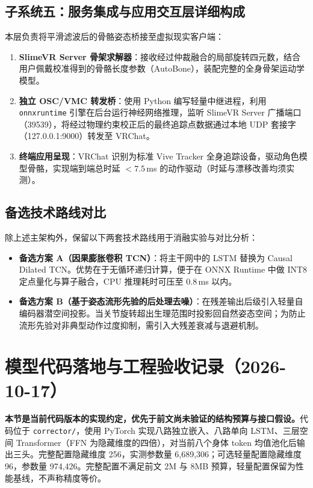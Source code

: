 \documentclass[UTF8,11pt,a4paper]{ctexart}
\begin{document}
\subsection{子系统五：服务集成与应用交互层详细构成}
本层负责将平滑滤波后的骨骼姿态桥接至虚拟现实客户端：
\begin{enumerate}
    \item \textbf{SlimeVR Server 骨架求解器}：接收经过仲裁融合的局部旋转四元数，结合用户佩戴校准得到的骨骼长度参数（AutoBone），装配完整的全身骨架运动学模型。
    \item \textbf{独立 OSC/VMC 转发桥}：使用 Python 编写轻量中继进程，利用 \texttt{onnxruntime} 引擎在后台运行神经网络推理，监听 SlimeVR Server 广播端口（39539），将经过物理约束校正后的最终追踪点数据通过本地 UDP 套接字（127.0.0.1:9000）转发至 VRChat。
    \item \textbf{终端应用呈现}：VRChat 识别为标准 Vive Tracker 全身追踪设备，驱动角色模型骨骼，实现端到端总时延 $< 7.5$\,ms 的动作驱动（时延与漂移改善均须实测）。
\end{enumerate}

\subsection{备选技术路线对比}
除上述主架构外，保留以下两套技术路线用于消融实验与对比分析：
\begin{itemize}
    \item \textbf{备选方案 A（因果膨胀卷积 TCN）}：将主干网中的 LSTM 替换为 Causal Dilated TCN。优势在于无循环递归计算，便于在 ONNX Runtime 中做 INT8 定点量化与算子融合，CPU 推理耗时可压至 $0.8$\,ms 以内。
    \item \textbf{备选方案 B（基于姿态流形先验的后处理去噪）}：在残差输出后级引入轻量自编码器潜空间投影。当关节旋转超出生理范围时投影回自然姿态空间；为防止流形先验对非典型动作过度抑制，需引入大残差衰减与退避机制。
\end{itemize}

\section{模型代码落地与工程验收记录（2026-10-17）}
\textbf{本节是当前代码版本的实现约定，优先于前文尚未验证的结构预算与接口假设。}代码位于 \texttt{corrector/}，使用 PyTorch 实现八路独立嵌入、八路单向 LSTM、三层空间 Transformer（FFN 为隐藏维度的四倍），对当前八个身体 token 均值池化后输出三头。完整配置隐藏维度 256，实测参数量 6,689,306；可选轻量配置隐藏维度 96，参数量 974,426。完整配置不满足前文 2M 与 8MB 预算，轻量配置保留为性能基线，不声称精度等价。
\end{document}
